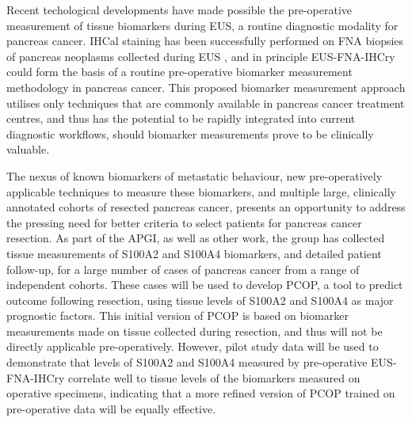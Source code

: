 \documentclass[dissertation.tex]{subfiles}
\begin{document}
Recent techological developments have made possible the pre-operative measurement of tissue biomarkers during \gls{EUS}, a routine diagnostic modality for pancreas cancer.  \Gls{IHCal} staining has been successfully performed on \gls{FNA} biopsies of pancreas neoplasms collected during \gls{EUS} \cite{Popescu2012, Salla2009, Stelow2005}, and in principle \gls{EUS}-\gls{FNA}-\acrshort{IHCry} could form the basis of a routine pre-operative biomarker measurement methodology in pancreas cancer.  This proposed biomarker measurement approach utilises only techniques that are commonly available in pancreas cancer treatment centres, and thus has the potential to be rapidly integrated into current diagnostic workflows, should biomarker measurements prove to be clinically valuable.

The nexus of known biomarkers of metastatic behaviour, new pre-operatively applicable techniques to measure these biomarkers, and multiple large, clinically annotated cohorts of resected pancreas cancer, presents an opportunity to address the pressing need for better criteria to select patients for pancreas cancer resection.  As part of the \gls{APGI}, as well as other work, the group has collected tissue measurements of S100A2 and S100A4 biomarkers, and detailed patient follow-up, for a large number of cases of pancreas cancer from a range of independent cohorts.  These cases will be used to develop \gls{PCOP}, a tool to predict outcome following resection, using tissue levels of S100A2 and S100A4 as major prognostic factors.  This initial version of \gls{PCOP} is based on biomarker measurements made on tissue collected during resection, and thus will not be directly applicable pre-operatively.  However, pilot study data will be used to demonstrate that levels of S100A2 and S100A4 measured by pre-operative \gls{EUS}-\gls{FNA}-\acrshort{IHCry} correlate well to tissue levels of the biomarkers measured on operative specimens, indicating that a more refined version of \gls{PCOP} trained on pre-operative data will be equally effective.
\end{document}
